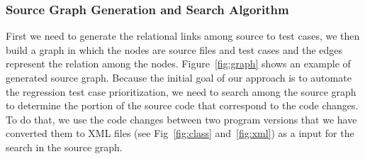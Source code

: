 


%




\subsubsection{Source Graph Generation and Search Algorithm}
\label{sec:tree}


First we need to generate the relational links among source
to test cases, we then build a graph in which the nodes
are source files and test cases and the edges represent 
the relation among the nodes.
Figure~\ref{fig:graph} shows an example of generated 
source graph. 
Because the initial goal of our approach is to 
automate the regression test case prioritization, we need to 
search among the source graph to determine the
portion of the source code that correspond to the
code changes.  
To do that, we use the code changes 
between two program versions that we have converted them to 
XML files (see Fig~\ref{fig:class} and~\ref{fig:xml})
as a input for the search in the source graph. 

